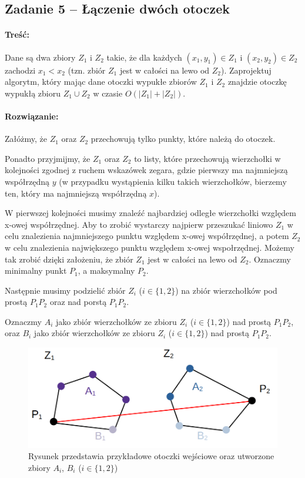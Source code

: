 \subsection{Zadanie 5 -- Łączenie dwóch otoczek}
\paragraph{Treść:} Dane są dwa zbiory $Z_1$ i $Z_2$ takie, że dla każdych $(x_1, y_1) \in Z_1$ i $(x_2, y_2) \in Z_2$ zachodzi $x_1 < x_2$ (tzn. zbiór $Z_1$ jest w całości na lewo od $Z_2$). Zaprojektuj algorytm, który mając dane otoczki wypukłe zbiorów $Z_1$ i $Z_2$
znajdzie otoczkę wypukłą zbioru $Z_1 \cup Z_2$ w czasie $O(|Z_1| + |Z_2|)$.

\paragraph{Rozwiązanie:} 
Załóżmy, że $Z_1$ oraz $Z_2$ przechowują tylko punkty, które należą do 
otoczek.

Ponadto przyjmijmy, że $Z_1$ oraz $Z_2$ to listy, które przechowują wierzchołki w kolejności zgodnej z ruchem wskazówek zegara, gdzie pierwszy ma najmniejszą współrzędną $y$ (w przypadku wystąpienia kilku takich wierzchołków, bierzemy ten, który ma najmniejszą współrzędną $x$).

W pierwszej kolejności musimy znaleźć najbardziej odległe 
wierzchołki względem x-owej współrzędnej. Aby to zrobić wystarczy
najpierw przeszukać liniowo $Z_1$ w celu znalezienia
najmniejszego punktu względem x-owej współrzędnej, a potem $Z_2$ w celu znalezienia największego punktu względem x-owej wspołrzędnej. Możemy 
tak zrobić dzięki założeniu, że zbiór $Z_1$ jest w całości na lewo od $Z_2$. Oznaczmy minimalny punkt $P_1$, a maksymalny $P_2$.

Następnie musimy podzielić zbiór $Z_i$ ($i \in \{1, 2\}$) na 
zbiór wierzchołków pod prostą $P_1P_2$ oraz nad porstą $P_1P_2$.

Oznaczmy $A_i$ jako zbiór wierzchołków ze zbioru $Z_i$ ($i \in \{1, 2\}$) nad prostą $P_1P_2$, oraz $B_i$ jako zbiór wierzchołków ze zbioru $Z_i$ ($i \in \{1, 2\}$) nad prostą $P_1P_2$.

\begin{figure}[H]
	\centering
	\includegraphics[scale=0.5]{data/zad75.png}
	\caption{Rysunek przedstawia przykładowe otoczki wejściowe oraz utworzone zbiory $A_i$, $B_i$ ($i \in \{1, 2\}$)}
	\label{fig:laczenieotoczek}
\end{figure}

